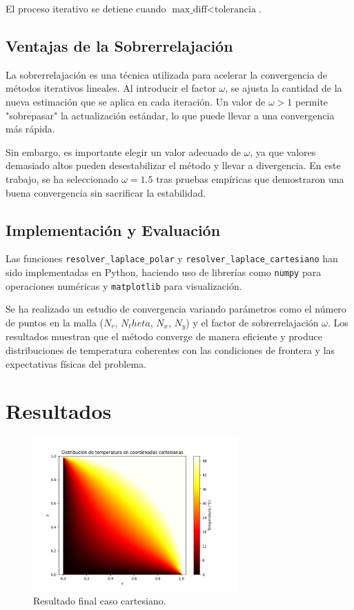 El proceso iterativo se detiene cuando $\text{max\_diff} < \text{tolerancia}$.

\section{Ventajas de la Sobrerrelajación}

La sobrerrelajación es una técnica utilizada para acelerar la convergencia de métodos iterativos lineales. Al introducir el factor $\omega$, se ajusta la cantidad de la nueva estimación que se aplica en cada iteración. Un valor de $\omega > 1$ permite "sobrepasar" la actualización estándar, lo que puede llevar a una convergencia más rápida.

Sin embargo, es importante elegir un valor adecuado de $\omega$, ya que valores demasiado altos pueden desestabilizar el método y llevar a divergencia. En este trabajo, se ha seleccionado $\omega = 1.5$ tras pruebas empíricas que demostraron una buena convergencia sin sacrificar la estabilidad.

\section{Implementación y Evaluación}

Las funciones \texttt{resolver\_laplace\_polar} y \texttt{resolver\_laplace\_cartesiano} han sido implementadas en Python, haciendo uso de librerías como \texttt{numpy} para operaciones numéricas y \texttt{matplotlib} para visualización.

Se ha realizado un estudio de convergencia variando parámetros como el número de puntos en la malla ($N_r$, $N_theta$, $N_x$, $N_y$) y el factor de sobrerrelajación $\omega$. Los resultados muestran que el método converge de manera eficiente y produce distribuciones de temperatura coherentes con las condiciones de frontera y las expectativas físicas del problema.

\chapter{Resultados}

\begin{figure}[h!]
    \centering
    \includegraphics[width=0.7\textwidth]{figuras/ecuacion_laplace_cartesiano.png}
    \caption{Resultado final caso cartesiano.}
    \label{fig:resultado_cartesiano}
\end{figure}

